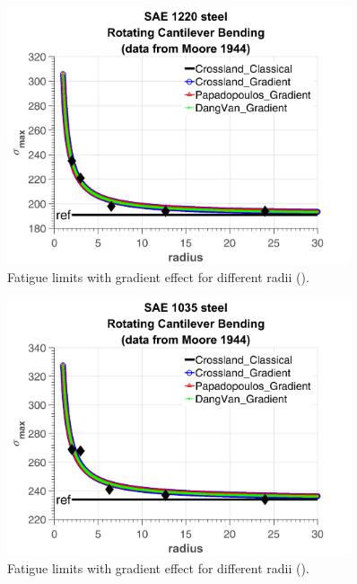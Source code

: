 \begin{figure}[!h]
	\begin{center}
		\includegraphics[width=0.9\textwidth]{figures//1220steel.png} 
		\caption{Fatigue limits with gradient effect for different radii (\cite{Moore1944}).}
		\label{fig.gradientcalibration2}
	\end{center}
\end{figure}

\begin{figure}[!h]
	\begin{center}
		\includegraphics[width=0.9\textwidth]{figures//1035steel.png} 
		\caption{Fatigue limits with gradient effect for different radii (\cite{Pogoretskii1966}).}
		\label{fig.gradientcalibration3}
	\end{center}
\end{figure}

